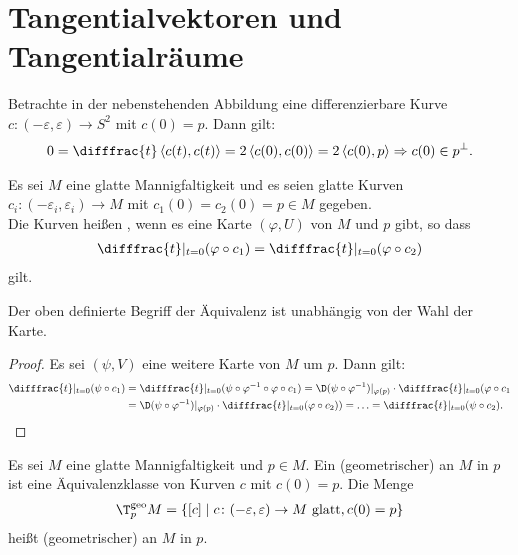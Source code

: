 
\section{Tangentialvektoren und Tangentialräume}


Betrachte in der nebenstehenden Abbildung eine differenzierbare Kurve $c \colon (-\varepsilon,\varepsilon) \to S^2$ mit $c(0) = p$. Dann gilt:
\begin{align*}
  0 = \difffrac{t} \left<c(t),c(t)\right> = 2\left<c(0),c(0)\right> = 2 \left<c(0),p\right> 
  \Rightarrow c(0) \in p^{\perp}.
\end{align*}


Es sei $M$ eine glatte Mannigfaltigkeit und es seien glatte Kurven $c_i\colon (-\varepsilon_i,\varepsilon_i) \to M$ mit $c_1(0) = c_2(0) = p \in M$ gegeben.\\

Die Kurven heißen , wenn es eine Karte $(\varphi,U)$ von $M$ und $p$ gibt, so dass 
\begin{align*}
  \difffrac{t}|_{t=0}(\varphi \circ c_1) = \difffrac{t}|_{t=0}(\varphi \circ c_2)
\end{align*}
gilt.

\begin{lemma}
  Der oben definierte Begriff der Äquivalenz ist unabhängig von der Wahl der Karte.
\end{lemma}

\begin{proof}
  Es sei $(\psi,V)$ eine weitere Karte von $M$ um $p$. Dann gilt:
  \begin{align*}
    \difffrac{t}|_{t=0}(\psi\circ c_1) & = \difffrac{t}|_{t=0}(\psi\circ\varphi^{-1}\circ\varphi \circ c_1) = \D (\psi \circ \varphi^{-1})|_{\varphi(p)} \cdot \difffrac{t}|_{t=0}(\varphi \circ c_1\\
    & = \D(\psi \circ \varphi^{-1})|_{\varphi(p)} \cdot \difffrac{t}|_{t=0}(\varphi \circ c_2) ) = \ldots = \difffrac{t}|_{t=0}(\psi \circ c_2).
  \end{align*}
\end{proof}

\begin{dfn}
  Es sei $M$ eine glatte Mannigfaltigkeit und $p \in M$. Ein (geometrischer)  an $M$ in $p$ ist eine Äquivalenzklasse von Kurven $c$ mit $c(0) = p$. Die Menge
  \begin{align*}
    \T_{p}^{\text{geo}}M = \{ [c] \mid c \colon (-\varepsilon,\varepsilon) \to M \text{ glatt}, c(0) = p\}
  \end{align*}
  heißt (geometrischer)  an $M$ in $p$.
\end{dfn}

